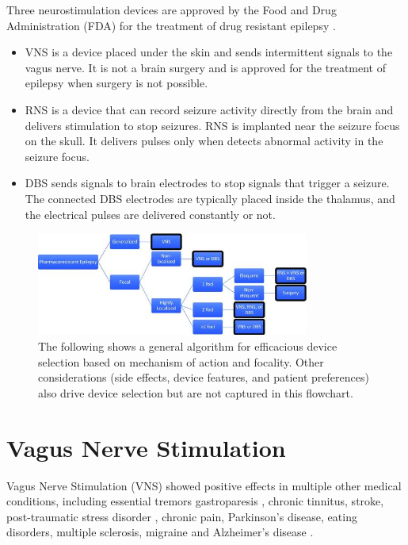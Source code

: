   Three neurostimulation devices are approved by the Food and Drug Administration (FDA) for the treatment of drug resistant epilepsy \cite{wong2019comparison}.
  \begin{itemize}
    \item VNS is a device placed under the skin and sends intermittent signals to the vagus nerve. It is not a brain surgery and is approved for the treatment of epilepsy when surgery is not possible. \cite{Neuromod7:online}
    \item RNS is a device that can record seizure activity directly from the brain and delivers stimulation to stop seizures. RNS is implanted near the seizure focus on the skull. It delivers pulses only when detects abnormal activity in the seizure focus. \cite{Neuromod7:online}
    \item DBS sends signals to brain electrodes to stop signals that trigger a seizure. The connected DBS electrodes are typically placed inside the thalamus, and the electrical pulses are delivered constantly or not. \cite{Neuromod7:online}
  \end{itemize}

  \begin{figure}[h]
    \centering
    \includegraphics[width=0.8\textwidth]{images/WongMani2019.jpeg}
    \caption{The following shows a general algorithm for efficacious device selection based on mechanism of action and focality. Other considerations (side effects, device features, and patient preferences) also drive device selection but are not captured in this flowchart. \cite{wong2019comparison}}
    \label{fig:Decision algorithm}
  \end{figure}

\section{Vagus Nerve Stimulation}
Vagus Nerve Stimulation (VNS) showed positive effects in multiple other medical conditions, including essential tremors gastroparesis \cite{KRAHL2004135}, chronic tinnitus, stroke, post-traumatic stress disorder \cite{HAYS2013275}, chronic pain, Parkinson's disease, eating disorders, multiple sclerosis, migraine and Alzheimer's disease \cite{BRONCEL202037, BeekwilderBeems2010}.

